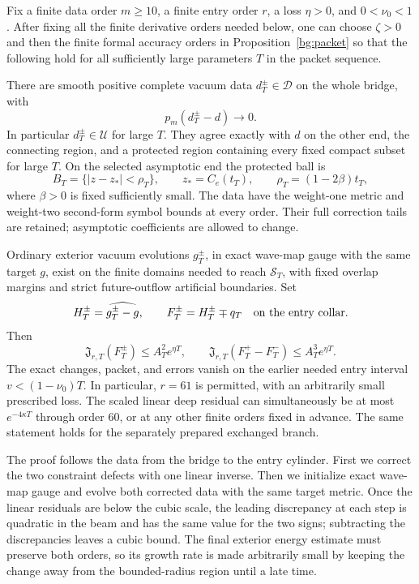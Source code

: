 \begin{proposition}\label{prep:signed-entry}
Fix a finite data order $m\ge10$, a finite entry order $r$, a loss
$\eta>0$, and $0<\nu_0<1$.  After fixing all the finite derivative
orders needed below, one can choose $\zeta>0$ and then the finite
formal accuracy orders in Proposition~\ref{bg:packet} so that the
following hold for all sufficiently large parameters $T$ in the
packet sequence.

There are smooth positive complete vacuum data $d_T^\pm\in\mathcal D$
on the whole bridge, with
\begin{equation}\label{prep:data-convergence}
 p_m(d_T^\pm-d)\longrightarrow0.
\end{equation}
In particular $d_T^\pm\in\mathcal U$ for large $T$.
They agree exactly with $d$ on the other end, the connecting region,
and a protected region containing every fixed compact subset for
large $T$.  On the selected asymptotic end the protected ball is
\begin{equation}\label{prep:protected-ball}
 B_T=\{|z-z_*|<\rho_T\},\qquad
 z_*=C_e(t_T),\qquad \rho_T=(1-2\beta)t_T,
\end{equation}
where $\beta>0$ is fixed sufficiently small.  The data have the
weight-one metric and weight-two second-form symbol bounds at every
order.  Their full correction tails are retained; asymptotic
coefficients are allowed to change.

Ordinary exterior vacuum evolutions $g_T^\pm$, in exact wave-map gauge
with the same target $g$, exist on the finite domains needed to reach
$\mathcal S_T$, with fixed overlap margins and strict future-outflow
artificial boundaries.  Set
\[
 H_T^\pm=\widehat{g_T^\pm-g},\qquad
 F_T^\pm=H_T^\pm\mp q_T
 \quad\hbox{on the entry collar}.
\]
Then
\begin{equation}\label{prep:entry-estimates}
 \mathfrak J_{r,T}(F_T^\pm)\le A_T^2e^{\eta T},\qquad
 \mathfrak J_{r,T}(F_T^+-F_T^-)\le A_T^3e^{\eta T}.
\end{equation}
The exact changes, packet, and errors vanish on the earlier needed
entry interval $v<(1-\nu_0)T$.  In particular, $r=61$ is permitted,
with an arbitrarily small prescribed loss.  The scaled linear deep
residual can simultaneously be at most $e^{-4\kappa T}$ through
order $60$, or at any other finite orders fixed in advance.
The same statement holds for the separately prepared exchanged branch.
\end{proposition}

The proof follows the data from the bridge to the entry cylinder.
First we correct the two constraint defects with one linear inverse.
Then we initialize exact wave-map gauge and evolve both corrected data
with the same target metric. Once the linear residuals are below the
cubic scale, the leading discrepancy at each step is quadratic in the
beam and has the same value for the two signs;
subtracting the discrepancies leaves a cubic bound. The final exterior
energy estimate must preserve both orders, so its growth rate is made
arbitrarily small by keeping the change away from the bounded-radius
region until a late time.

